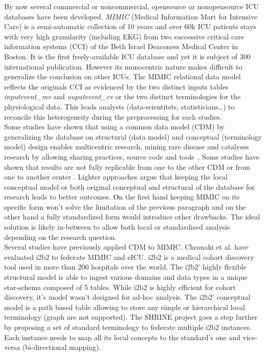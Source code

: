 By now several commercial or noncommercial, opensource or nonopensource ICU
databases have been developed.
\emph{MIMIC} (Medical Information Mart for Intensive Care) is a semi-automatic
collection of 10 years and over 60k ICU patients stays with very high
granularity (including EKG) from two successive critical care information
systems (CCI) of the Beth Israel Deaconess Medical Center in Boston. It is the
first freely-available ICU database and yet it is subject of 300 international
publication. However its monocentric nature makes difficult to generalize the
conclusion on other ICUs. The MIMIC relational data model reflects the originals
CCI as evidenced by the two distinct inputs tables \textit{inputevent\_mv} and
\textit{ouputevent\_cv} \cite{mimic-nature} or the two distinct terminologies
for the physiological data. This leads analysts (data-scientitsts,
statisticians\ldots) to reconcile this heterogeneity during the preprocessing
for each studies.
\\

Some studies have shown that using a common data model (CDM) by generalizing
the database on structural (data model) and conceptual (terminology model)
design enables multicentric research, mining rare disease and catalyses
research by allowing sharing practices, source code and
tools \cite{cdm-review,data-enclave}. 
Some studies have shown that results are not fully replicable from one to the
other CDM \cite{cdm-comparison} or from one to another center
\cite{omop-replicability}. Lighter approaches argue that keeping the local
conceptual model \cite{fhir-deep} or both original conceptual and structural
\cite{imi-protect} of the database for research leads to better outcomes. On
the first hand keeping MIMIC on its specific form won't solve the limitation of
the previous paragraph and on the other hand a fully standardized form would
introduce other drawbacks. The ideal solution is likely in-between to allow
both local or standardized analysis depending on the research question.
\\

Several studies have previously applied CDM to MIMIC. Chronaki et al.
\cite{mimic-i2b2} have evaluated i2b2 to federate MIMIC and eICU. i2b2 is a
medical cohort discovery tool used in more than 200 hospitals over the world.
The i2b2' highly flexible structural model is able to ingest various domains
and data types in a unique star-schema composed of 5 tables. While i2b2 is
highly efficient for cohort discovery, it's model wasn't designed for ad-hoc
analysis.
The i2b2' conceptual model is a path based table allowing to store any simple
or hierarchical local terminology (graph are not supported). The SHRINE project
goes a step further by proposing a set of standard terminology to federate
multiple i2b2 instances. Each instance needs to map all its local concepts to
the standard's one and vice-versa \cite{shrine-design} (bi-directional
mapping).

